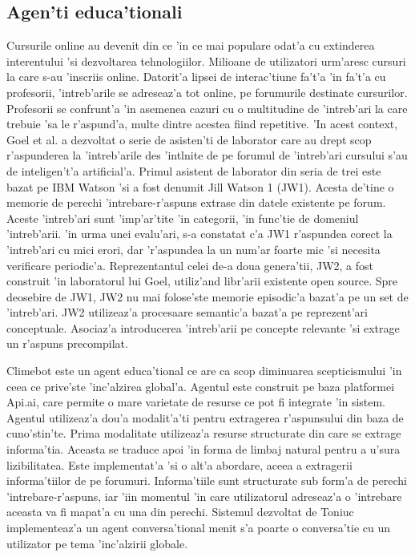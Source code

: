 \documentclass[12pt,a4paper,twoside]{report}
\begin{document}
\subsection{Agen'ti educa'tionali}


Cursurile online au devenit din ce 'in ce mai populare odat'a cu extinderea interentului 'si dezvoltarea tehnologiilor. Milioane de utilizatori urm'aresc cursuri la care s-au 'inscriis online. Datorit'a lipsei de interac'tiune fa't'a 'in fa't'a cu profesorii, 'intreb'arile se adreseaz'a tot online, pe forumurile destinate cursurilor. Profesorii se confrunt'a 'in asemenea cazuri cu o multitudine de 'intreb'ari la care trebuie 'sa le r'aspund'a, multe dintre acestea fiind repetitive. 'In acest context, Goel et al. \cite{WatsonAEducation} a dezvoltat o serie de asisten'ti de laborator care au drept scop r'aspunderea la 'intreb'arile des 'int\ia lnite de pe forumul de 'intreb'ari cursului s'au de inteligen't'a artificial'a. 
Primul asistent de laborator din seria de trei este bazat pe IBM Watson 'si a fost denumit Jill Watson 1 (JW1). Acesta de'tine o memorie de perechi 'intrebare-r'aspuns extrase din datele existente pe forum. Aceste 'intreb'ari sunt 'imp'ar'tite 'in categorii, 'in func'tie de domeniul 'intreb'arii. 'in urma unei evalu'ari, s-a constatat c'a JW1 r'aspundea corect la 'intreb'ari cu mici erori, dar 'r'aspundea la un num'ar foarte mic 'si necesita verificare periodic'a. Reprezentantul celei de-a doua genera'tii, JW2, a fost construit 'in laboratorul lui Goel, utiliz'and libr'arii existente open source. Spre deosebire de JW1, JW2 nu mai folose'ste memorie episodic'a bazat'a pe un set de 'intreb'ari. JW2 utilizeaz'a procesaare semantic'a bazat'a pe reprezent'ari conceptuale. Asociaz'a introducerea 'intreb'arii pe concepte relevante 'si extrage un r'aspuns precompilat.


Climebot \cite{toniuc2017climebot} este un agent educa'tional ce are ca scop diminuarea scepticismului 'in ceea ce prive'ste 'inc'alzirea global'a. Agentul este construit pe baza platformei Api.ai, care permite o mare varietate de resurse ce pot fi integrate 'in sistem. Agentul utilizeaz'a dou'a modalit'a'ti pentru extragerea r'aspunsului din baza de cuno'stin'te. Prima modalitate utilizeaz'a resurse structurate din care se extrage informa'tia. Aceasta se traduce apoi 'in forma de limbaj natural pentru a u'sura lizibilitatea. Este implementat'a 'si o alt'a abordare, aceea a extragerii informa'tiilor de pe forumuri. Informa'tiile sunt structurate sub form'a de perechi 'intrebare-r'aspuns, iar 'iin momentul 'in care utilizatorul adreseaz'a o 'intrebare aceasta va fi mapat'a cu una din perechi. Sistemul dezvoltat de Toniuc implementeaz'a un agent conversa'tional menit s'a poarte o conversa'tie cu un utilizator pe tema 'inc'alzirii globale.
\end{document}
